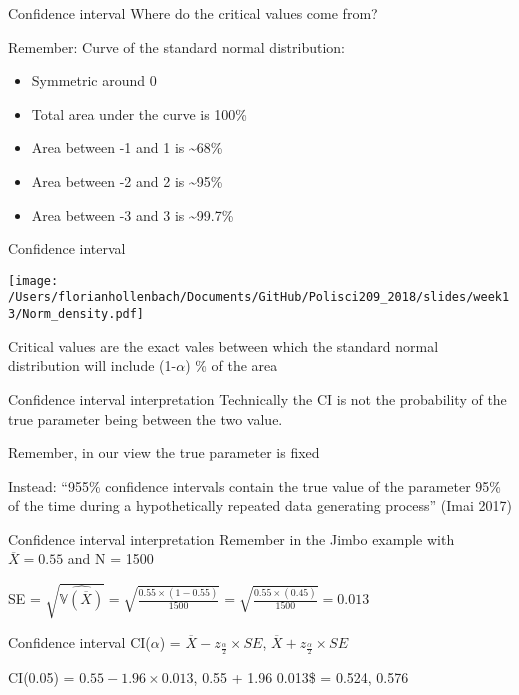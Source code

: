 \documentclass[presentation]{beamer}
\newcommand{\V}{\mathbb{V}}
\begin{document}
\begin{frame}[label={sec:org392c215}]{Confidence interval}
Where do the critical values come from?

\pause
Remember: Curve of the standard normal distribution:

\begin{itemize}
\item Symmetric around 0
\item Total area under the curve is 100\%
\item Area between -1 and 1 is \textasciitilde{}68\%
\item Area between -2 and 2 is \textasciitilde{}95\%
\item Area between -3 and 3 is \textasciitilde{}99.7\%
\end{itemize}
\end{frame}

\begin{frame}[label={sec:org3ae94a8}]{Confidence interval}
\begin{center}
\texttt{[image: /Users/florianhollenbach/Documents/GitHub/Polisci209\_2018/slides/week13/Norm\_density.pdf]}
\end{center}

\alert{Critical values are the exact vales between which the standard normal distribution will include (1-\(\alpha\)) \% of the area}
\end{frame}

\begin{frame}[label={sec:org2c50225}]{Confidence interval interpretation}
Technically the CI is \alert{not} the probability of the true parameter being between the two value.

\pause
Remember, in our view the true parameter is fixed

Instead: ``955\% confidence intervals contain the true value of the parameter 95\% of the time during a hypothetically repeated data generating process'' (Imai 2017)
\end{frame}

\begin{frame}[label={sec:org8e55df3}]{Confidence interval interpretation}
Remember in the Jimbo example with \(\overline{X} = 0.55\) and N = 1500

SE = \(\sqrt{\widehat{\V(\overline{X})}} = \sqrt{\frac{0.55 \times (1-0.55)}{1500}} = \sqrt{\frac{0.55 \times (0.45)}{1500}} = 0.013\)
\end{frame}

\begin{frame}[label={sec:orgd7cb02d}]{Confidence interval}
CI(\(\alpha\)) = \(\overline{X} - z_{\frac{\alpha}{2}} \times SE\),  \(\overline{X} + z_{\frac{\alpha}{2}} \times SE\)

\pause

CI(0.05) = \(0.55 - 1.96 \times 0.013\),  0.55 +  1.96 \texttimes{} 0.013\$ = 0.524, 0.576
\end{frame}
\end{document}
